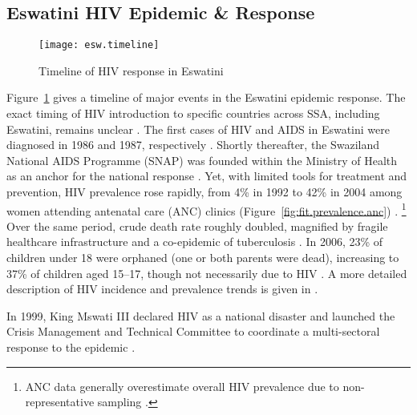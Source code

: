 \subsection{Eswatini HIV Epidemic \& Response}\label{intro.esw.hiv}
\begin{figure}
  \centering
  \texttt{[image: esw.timeline]}
  \caption{Timeline of HIV response in Eswatini}
  \label{fig:esw.timeline}
\end{figure}
Figure~\ref{fig:esw.timeline} gives a timeline of major events in the Eswatini epidemic response.
The exact timing of HIV introduction to specific countries across SSA, including Eswatini,
remains unclear \cite{Iliffe2005}.
The first cases of HIV and AIDS in Eswatini
were diagnosed in 1986 and 1987, respectively \cite{Whiteside2007}.
Shortly thereafter, the Swaziland National AIDS Programme (SNAP) was founded
within the Ministry of Health as an anchor for the national response \cite{Mabuza2017}.
Yet, with limited tools for treatment and prevention,
HIV prevalence rose rapidly, from 4\% in 1992 to 42\% in 2004
among women attending antenatal care (ANC) clinics
(Figure~\ref{fig:fit.prevalence.anc}) \cite{NERCHA2012}.%
\footnote{ANC data generally overestimate overall HIV prevalence
  due to non-representative sampling \cite{Gouws2008,Marsh2014}.}
Over the same period, crude death rate roughly doubled, magnified by
fragile healthcare infrastructure and a co-epidemic of tuberculosis \cite{Whiteside2007}.
In 2006, 23\% of children under 18 were orphaned (one or both parents were dead),
increasing to 37\% of children aged 15--17,
though not necessarily due to HIV \cite{SDHS2006}.
A more detailed description of HIV incidence and prevalence trends
is given in .
\par
In 1999, King Mswati III declared HIV as a national disaster and
launched the Crisis Management and Technical Committee
to coordinate a multi-sectoral response to the epidemic \cite{Mabuza2017}.
